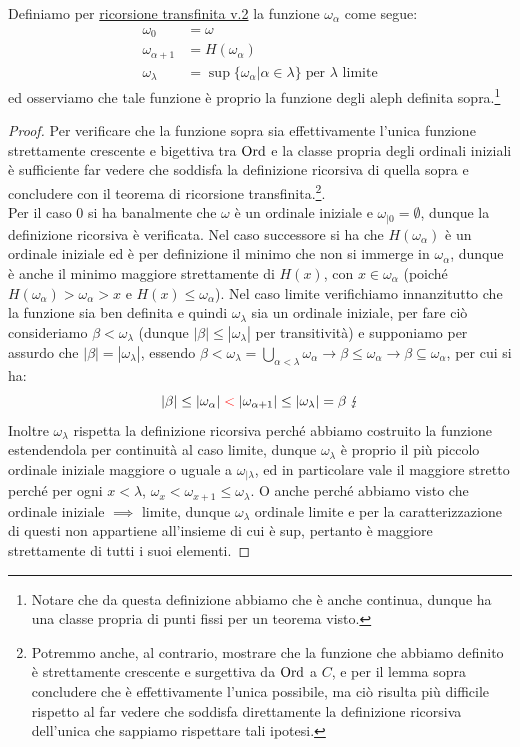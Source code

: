 \begin{proposition}
	Definiamo per \hyperref[ric_transf2]{ricorsione transfinita v.2} la funzione $\omega_\alpha$ come segue:
	\begin{align*}
		\omega_0 &= \omega \\
		\omega_{\alpha + 1} &= H(\omega_\alpha) \\
		\omega_\lambda &= \sup\{\omega_\alpha | \alpha \in \lambda\} \; \text{per $\lambda$ limite}
	\end{align*}
	ed osserviamo che tale funzione è proprio la funzione degli aleph definita sopra.\footnote{Notare che da questa definizione abbiamo che è anche continua, dunque ha una classe propria di punti fissi per un teorema visto.}
\end{proposition}

\begin{proof}
	Per verificare che la funzione sopra sia effettivamente l'unica funzione strettamente crescente e bigettiva tra $\operatorname{Ord}$ e la classe propria degli ordinali iniziali è sufficiente far vedere che soddisfa la definizione
	ricorsiva di quella sopra e concludere con il teorema di ricorsione transfinita.\footnote{Potremmo anche, al contrario, mostrare che la funzione che abbiamo definito è strettamente crescente e surgettiva da $\operatorname{Ord}$ a $C$, e per
	il lemma sopra concludere che è effettivamente l'unica possibile, ma ciò risulta più difficile rispetto al far vedere che soddisfa direttamente la definizione ricorsiva dell'unica che sappiamo rispettare tali ipotesi.}.\\
	Per il caso 0 si ha banalmente che $\omega$ è un ordinale iniziale e $\omega_{|0} = \emptyset$, dunque la definizione ricorsiva è verificata. Nel caso successore si ha che $H(\omega_\alpha)$ è un ordinale iniziale ed è per definizione il minimo che non si immerge in $\omega_\alpha$, dunque è anche il minimo maggiore strettamente di $H(x)$, con
	$x \in \omega_\alpha$ (poiché $H(\omega_\alpha) > \omega_\alpha > x$ e $H(x) \leq \omega_\alpha$).
	Nel caso limite verifichiamo innanzitutto che la funzione sia ben definita e quindi $\omega_\lambda$ sia un ordinale iniziale, per fare ciò consideriamo $\beta < \omega_\lambda$ (dunque $|\beta| \leq |\omega_\lambda|$ per transitività) e supponiamo per assurdo che $|\beta| = |\omega_\lambda|$,
	essendo $\beta < \omega_\lambda = \bigcup_{\alpha < \lambda} \omega_\alpha \to \beta \leq \omega_\alpha \to \beta \subseteq \omega_\alpha$, per cui si ha:
	\[ |\beta| \leq |\omega_\alpha| \;\textcolor{red}{<}\; |\omega_{\alpha + 1}| \leq |\omega_\lambda| = \beta \; \lightning
		\]
	Inoltre $\omega_\lambda$ rispetta la definizione ricorsiva perché abbiamo costruito la funzione estendendola per continuità al caso limite, dunque $\omega_\lambda$ è proprio il più piccolo ordinale iniziale maggiore o uguale a $\omega_{|\lambda}$,
	ed in particolare vale il maggiore stretto perché per ogni $x < \lambda$, $\omega_x < \omega_{x + 1} \leq \omega_{\lambda}$. O anche perché abbiamo visto che ordinale iniziale $\implies$ limite, dunque $\omega_\lambda$ ordinale limite e per la caratterizzazione di questi non appartiene all'insieme di cui è sup,
	pertanto è maggiore strettamente di tutti i suoi elementi.
\end{proof}

